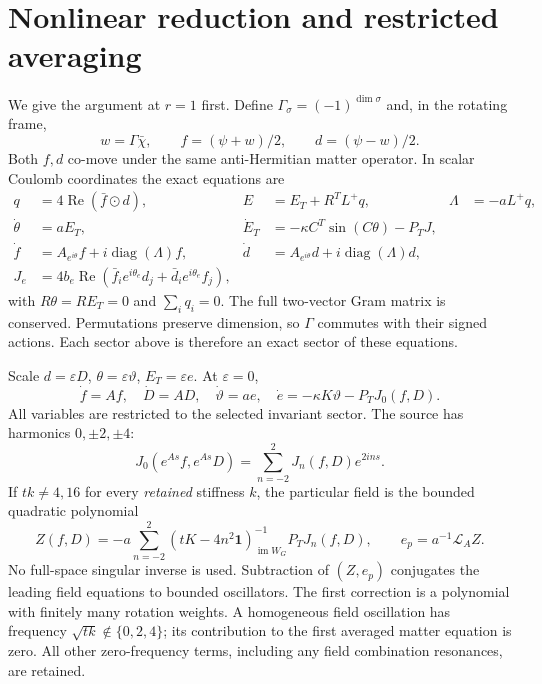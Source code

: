 \documentclass[11pt,a4paper]{article}
\newcommand{\id}{\mathbf1}\newcommand{\tr}{\operatorname{tr}}\newcommand{\diag}{\operatorname{diag}}\newcommand{\Fix}{\operatorname{Fix}}\newcommand{\Rea}{\operatorname{Re}}
\begin{document}
\newpage
\section{Nonlinear reduction and restricted averaging}
We give the argument at $r=1$ first. Define $\Gamma_\sigma=(-1)^{\dim\sigma}$ and, in the rotating frame,
\[
w=\Gamma\bar\chi,\qquad f=(\psi+w)/2,\qquad d=(\psi-w)/2.
\]
Both $f,d$ co-move under the same anti-Hermitian matter operator. In scalar Coulomb coordinates the exact equations are
\begin{align*}
q&=4\Rea(\bar f\odot d),& E&=E_T+R^TL^+q,&\Lambda&=-aL^+q,\\
\dot\theta&=aE_T,&\dot E_T&=-\kappa C^T\sin(C\theta)-P_TJ,\\
\dot f&=A_{e^{i\theta}}f+i\diag(\Lambda)f,&
\dot d&=A_{e^{i\theta}}d+i\diag(\Lambda)d,\\
J_e&=4b_e\Rea(\bar f_i e^{i\theta_e}d_j+\bar d_i e^{i\theta_e}f_j),
\end{align*}
with $R\theta=RE_T=0$ and $\sum_iq_i=0$. The full two-vector Gram matrix is conserved. Permutations preserve dimension, so $\Gamma$ commutes with their signed actions. Each sector above is therefore an exact sector of these equations.

Scale $d=\varepsilon D$, $\theta=\varepsilon\vartheta$, $E_T=\varepsilon e$. At $\varepsilon=0$,
\[
\dot f=Af,\quad\dot D=AD,\quad
\dot\vartheta=ae,\quad\dot e=-\kappa K\vartheta-P_TJ_0(f,D).
\]
All variables are restricted to the selected invariant sector. The source has harmonics $0,\pm2,\pm4$:
\[
J_0(e^{As}f,e^{As}D)=\sum_{n=-2}^{2}J_n(f,D)e^{2ins}.
\]
If $tk\ne4,16$ for every \emph{retained} stiffness $k$, the particular field is the bounded quadratic polynomial
\[
Z(f,D)=-a\sum_{n=-2}^{2}(tK-4n^2\id)^{-1}_{\operatorname{im}W_G}P_TJ_n(f,D),
\qquad e_p=a^{-1}\mathcal L_AZ.
\]
No full-space singular inverse is used. Subtraction of $(Z,e_p)$ conjugates the leading field equations to bounded oscillators. The first correction is a polynomial with finitely many rotation weights. A homogeneous field oscillation has frequency $\sqrt{tk}\notin\{0,2,4\}$; its contribution to the first averaged matter equation is zero. All other zero-frequency terms, including any field combination resonances, are retained.
\end{document}
